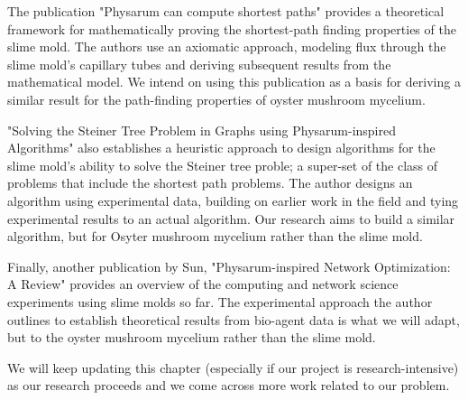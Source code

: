The publication "Physarum can compute shortest paths" \cite{phy_short_path} provides a theoretical framework for mathematically proving the shortest-path finding properties of the slime mold. The authors use an axiomatic approach, modeling flux through the slime mold's capillary tubes and deriving subsequent results from the mathematical model. We intend on using this publication as a basis for deriving a similar result for the path-finding properties of oyster mushroom mycelium.

"Solving the Steiner Tree Problem in Graphs
using Physarum-inspired Algorithms" \cite{steiner_tree} also establishes a heuristic approach to design algorithms for the slime mold's ability to solve the Steiner tree proble; a super-set of the class of problems that include the shortest path problems. The author designs an algorithm using experimental data, building on earlier work in the field and tying experimental results to an actual algorithm. Our research aims to build a similar algorithm, but for Osyter mushroom mycelium rather than the slime mold.

Finally, another publication by Sun, "Physarum-inspired Network Optimization: A
Review" \cite{phy_network_review} provides an overview of the computing and network science experiments using slime molds so far. The experimental approach the author outlines to establish theoretical results from bio-agent data is what we will adapt, but to the oyster mushroom mycelium rather than the slime mold.

We will keep updating this chapter (especially if our project is research-intensive) as our research proceeds and we come across more work related to our problem.